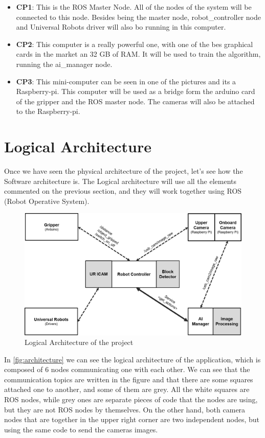 \begin{itemize}
			\begin{itemize}
				\item[\textendash]\textbf{CP1}: This is the ROS Master Node. All of the nodes of the system will be connected to this node. Besides being the master node, robot\_controller node and Universal Robots driver will also bo running in this computer.
				\item[\textendash]\textbf{CP2}: This computer is a really powerful one, with one of the bes graphical cards in the market an 32 GB of RAM. It will be used to train the algorithm, running the ai\_manager node.
				\item[\textendash]\textbf{CP3}: This mini-computer can be seen in one of the pictures and its a Raspberry-pi. This computer will be used as a bridge form the arduino card of the gripper and the ROS master node. The cameras will also be attached to the Raspberry-pi.
			\end{itemize}
		\end{itemize}
	
	\section{Logical Architecture}
		
		Once we have seen the physical architecture of the project, let's see how the Software architecture is. The Logical architecture will use all the elements commented on the previous section, and they will work together using ROS (Robot Operative System). 
		
		\begin{figure}
			\centering
			\includegraphics[width=0.7\linewidth]{Images/Architecture}
			\caption[Logical Architecture]{Logical Architecture of the project}
			\label{fig:architecture}
		\end{figure}
	
		In \autoref{fig:architecture} we can see the logical architecture of the application, which is composed of 6 nodes communicating one with each other. We can see that the communication topics are written in the figure and that there are some squares attached one to another, and some of them are grey. All the white squares are ROS nodes, while grey ones are separate pieces of code that the nodes are using, but they are not ROS nodes by themselves. On the other hand, both camera nodes that are together in the upper right corner are two independent nodes, but using the same code to send the cameras images.
		
